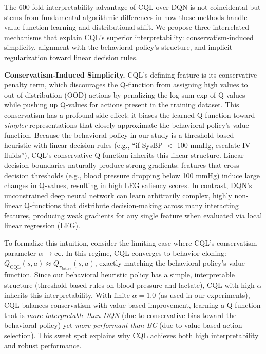 The 600-fold interpretability advantage of CQL over DQN is not coincidental but stems from fundamental algorithmic differences in how these methods handle value function learning and distributional shift. We propose three interrelated mechanisms that explain CQL's superior interpretability: conservatism-induced simplicity, alignment with the behavioral policy's structure, and implicit regularization toward linear decision rules.

\textbf{Conservatism-Induced Simplicity.} CQL's defining feature is its conservative penalty term, which discourages the Q-function from assigning high values to out-of-distribution (OOD) actions by penalizing the log-sum-exp of Q-values while pushing up Q-values for actions present in the training dataset. This conservatism has a profound side effect: it biases the learned Q-function toward \textit{simpler} representations that closely approximate the behavioral policy's value function. Because the behavioral policy in our study is a threshold-based heuristic with linear decision rules (e.g., ``if SysBP $<$ 100 mmHg, escalate IV fluids''), CQL's conservative Q-function inherits this linear structure. Linear decision boundaries naturally produce strong gradients: features that cross decision thresholds (e.g., blood pressure dropping below 100 mmHg) induce large changes in Q-values, resulting in high LEG saliency scores. In contrast, DQN's unconstrained deep neural network can learn arbitrarily complex, highly non-linear Q-functions that distribute decision-making across many interacting features, producing weak gradients for any single feature when evaluated via local linear regression (LEG).

To formalize this intuition, consider the limiting case where CQL's conservatism parameter $\alpha \to \infty$. In this regime, CQL converges to behavior cloning: $Q_{\text{CQL}}(s, a) \approx Q_{\pi_{\text{behav}}}(s, a)$, exactly matching the behavioral policy's value function. Since our behavioral heuristic policy has a simple, interpretable structure (threshold-based rules on blood pressure and lactate), CQL with high $\alpha$ inherits this interpretability. With finite $\alpha = 1.0$ (as used in our experiments), CQL balances conservatism with value-based improvement, learning a Q-function that is \textit{more interpretable than DQN} (due to conservative bias toward the behavioral policy) yet \textit{more performant than BC} (due to value-based action selection). This sweet spot explains why CQL achieves both high interpretability and robust performance.

